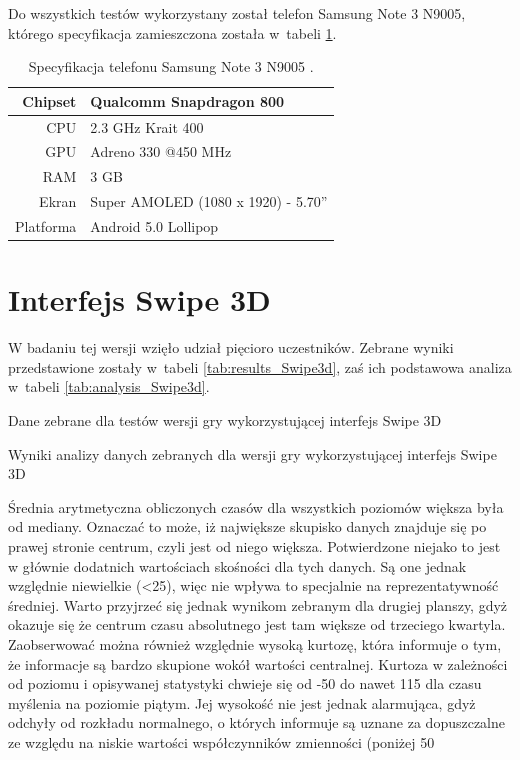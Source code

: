 \documentclass[a4paper,12pt,numbers=noenddot]{report}
\begin{document}
Do wszystkich testów wykorzystany został telefon Samsung Note 3 N9005, którego specyfikacja zamieszczona została w~tabeli \ref{tab:tab_telSpec}.

\begin{table}[H]
  \centering
  \caption{Specyfikacja telefonu Samsung Note 3 N9005 \cite{online_Note3Spec}.}
  \label{tab:tab_telSpec}
  \begin{tabular}{|r|l|}
    \hline
    Chipset & Qualcomm Snapdragon 800 \\
    \hline
    CPU & 2.3 GHz Krait 400\\
    \hline
    GPU & Adreno 330 @450 MHz\\
    \hline
    RAM & 3 GB\\
    \hline
    Ekran & Super AMOLED (1080 x 1920) - 5.70''\\
    \hline
    Platforma & Android 5.0 Lollipop\\
    \hline
  \end{tabular}
\end{table}


\section{Interfejs Swipe 3D}%
W badaniu tej wersji wzięło udział pięcioro uczestników. Zebrane wyniki przedstawione zostały w~tabeli \ref{tab:results_Swipe3d}, zaś ich podstawowa analiza w~tabeli \ref{tab:analysis_Swipe3d}. 

\begin{table}

  \caption{Dane zebrane dla testów wersji gry wykorzystującej interfejs Swipe 3D}
  \resizebox{\textwidth}{!}{%
	
  }
  \label{tab:results_Swipe3d}%
  \caption{Wyniki analizy danych zebranych dla wersji gry wykorzystującej interfejs Swipe 3D}
  \resizebox{\textwidth}{!}{%
	
  }
  \label{tab:analysis_Swipe3d}%
\end{table}%

Średnia arytmetyczna obliczonych czasów dla wszystkich poziomów większa była od mediany. Oznaczać to może, iż największe skupisko danych znajduje się po prawej stronie centrum, czyli jest od niego większa. Potwierdzone niejako to jest w głównie dodatnich wartościach skośności dla tych danych. Są one jednak względnie niewielkie (<25), więc nie wpływa to specjalnie na reprezentatywność średniej. 
Warto przyjrzeć się jednak wynikom zebranym dla drugiej planszy, gdyż okazuje się że centrum czasu absolutnego jest tam większe od trzeciego kwartyla. Zaobserwować można również względnie wysoką kurtozę, która informuje o tym, że informacje są bardzo skupione wokół wartości centralnej.
Kurtoza w zależności od poziomu i opisywanej statystyki chwieje się od -50 do nawet 115 dla czasu myślenia na poziomie piątym. Jej wysokość nie jest jednak alarmująca, gdyż odchyły od rozkładu normalnego, o których informuje są uznane za dopuszczalne ze względu na niskie wartości współczynników zmienności (poniżej 50%
\end{document}
